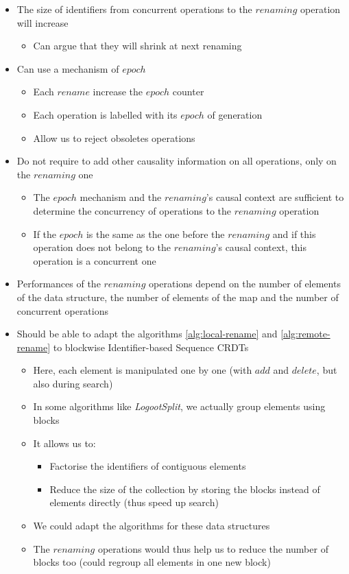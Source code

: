 \documentclass[a4paper]{article}
\begin{document}
\begin{itemize}
  \item The size of identifiers from concurrent operations to the $renaming$ operation will increase
  \begin{itemize}
    \item Can argue that they will shrink at next renaming
  \end{itemize}
  \item Can use a mechanism of $epoch$
  \begin{itemize}
    \item Each $rename$ increase the $epoch$ counter
    \item Each operation is labelled with its $epoch$ of generation
    \item Allow us to reject obsoletes operations
  \end{itemize}
  \item Do not require to add other causality information on all operations, only on the $renaming$ one
  \begin{itemize}
    \item The $epoch$ mechanism and the $renaming$'s causal context are sufficient
      to determine the concurrency of operations to the $renaming$ operation
    \item If the $epoch$ is the same as the one before the $renaming$
      and if this operation does not belong to the $renaming$'s causal context,
      this operation is a concurrent one
  \end{itemize}
  \item Performances of the $renaming$ operations depend on the number of elements
    of the data structure, the number of elements of the map
    and the number of concurrent operations
  \item Should be able to adapt the algorithms \ref{alg:local-rename} and \ref{alg:remote-rename}
    to blockwise Identifier-based Sequence \acp{CRDT}
  \begin{itemize}
    \item Here, each element is manipulated one by one (with $add$ and $delete$, but also during search)
    \item In some algorithms like \emph{LogootSplit},
      we actually group elements using blocks
    \item It allows us to:
    \begin{itemize}
      \item Factorise the identifiers of contiguous elements
      \item Reduce the size of the collection by storing
        the blocks instead of elements directly (thus speed up search)
    \end{itemize}
    \item We could adapt the algorithms for these data structures
    \item The $renaming$ operations would thus help us
      to reduce the number of blocks too (could regroup all elements in one new block)
  \end{itemize}
\end{itemize}
\end{document}
